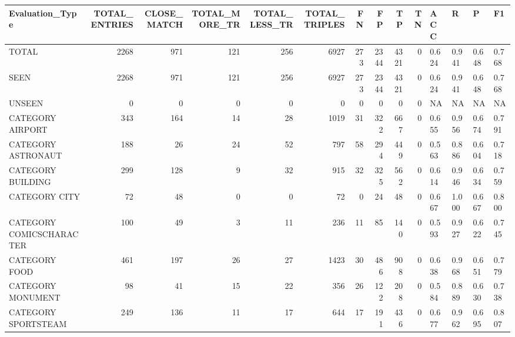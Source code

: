 \begin{tabular}{lrrrrrrrrrllll}
\hline
 Evaluation\_Type          &   TOTAL\_ENTRIES &   CLOSE\_MATCH &   TOTAL\_MORE\_TR &   TOTAL\_LESS\_TR &   TOTAL\_TRIPLES &   FN &   FP &   TP &   TN & ACC   & R     & P     & F1    \\
\hline
 TOTAL                    &            2268 &           971 &             121 &             256 &            6927 &  273 & 2344 & 4321 &    0 & 0.624 & 0.941 & 0.648 & 0.768 \\
 SEEN                     &            2268 &           971 &             121 &             256 &            6927 &  273 & 2344 & 4321 &    0 & 0.624 & 0.941 & 0.648 & 0.768 \\
 UNSEEN                   &               0 &             0 &               0 &               0 &               0 &    0 &    0 &    0 &    0 & NA    & NA    & NA    & NA    \\
 CATEGORY AIRPORT         &             343 &           164 &              14 &              28 &            1019 &   31 &  322 &  667 &    0 & 0.655 & 0.956 & 0.674 & 0.791 \\
 CATEGORY ASTRONAUT       &             188 &            26 &              24 &              52 &             797 &   58 &  294 &  449 &    0 & 0.563 & 0.886 & 0.604 & 0.718 \\
 CATEGORY BUILDING        &             299 &           128 &               9 &              32 &             915 &   32 &  325 &  562 &    0 & 0.614 & 0.946 & 0.634 & 0.759 \\
 CATEGORY CITY            &              72 &            48 &               0 &               0 &              72 &    0 &   24 &   48 &    0 & 0.667 & 1.000 & 0.667 & 0.800 \\
 CATEGORY COMICSCHARACTER &             100 &            49 &               3 &              11 &             236 &   11 &   85 &  140 &    0 & 0.593 & 0.927 & 0.622 & 0.745 \\
 CATEGORY FOOD            &             461 &           197 &              26 &              27 &            1423 &   30 &  486 &  908 &    0 & 0.638 & 0.968 & 0.651 & 0.779 \\
 CATEGORY MONUMENT        &              98 &            41 &              15 &              22 &             356 &   26 &  122 &  208 &    0 & 0.584 & 0.889 & 0.630 & 0.738 \\
 CATEGORY SPORTSTEAM      &             249 &           136 &              11 &              17 &             644 &   17 &  191 &  436 &    0 & 0.677 & 0.962 & 0.695 & 0.807 \\

\end{tabular}
